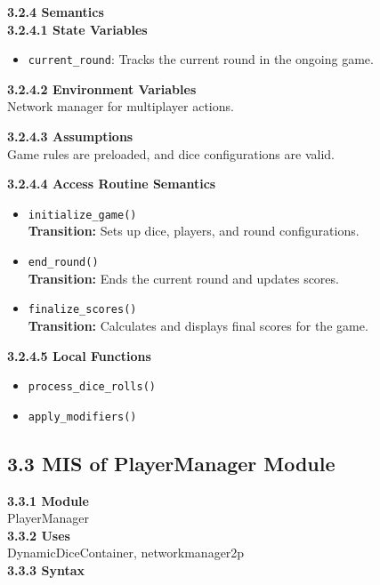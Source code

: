 \documentclass[12pt, titlepage]{article}
\begin{document}
\textbf{3.2.4 Semantics}\\
\textbf{3.2.4.1 State Variables}\\
\begin{itemize}
    \item \texttt{current\_round}: Tracks the current round in the ongoing game.
\end{itemize}

\textbf{3.2.4.2 Environment Variables}\\
Network manager for multiplayer actions.

\textbf{3.2.4.3 Assumptions}\\
Game rules are preloaded, and dice configurations are valid.

\textbf{3.2.4.4 Access Routine Semantics}
\begin{itemize}
    \item \texttt{initialize\_game()}\\
    \textbf{Transition:} Sets up dice, players, and round configurations.

    \item \texttt{end\_round()}\\
    \textbf{Transition:} Ends the current round and updates scores.

    \item \texttt{finalize\_scores()}\\
    \textbf{Transition:} Calculates and displays final scores for the game.
\end{itemize}

\textbf{3.2.4.5 Local Functions}
\begin{itemize}
    \item \texttt{process\_dice\_rolls()}
    \item \texttt{apply\_modifiers()}
\end{itemize}

\subsection*{3.3 MIS of PlayerManager Module}
\textbf{3.3.1 Module}\\
 PlayerManager\\

\noindent \textbf{3.3.2 Uses}\\
DynamicDiceContainer,  networkmanager2p\\

\noindent \textbf{3.3.3 Syntax}
\end{document}
